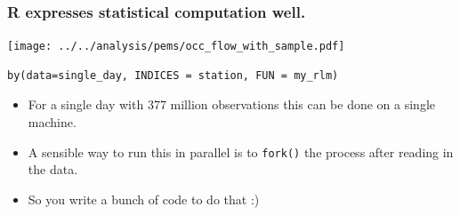 \documentclass{beamer}
\begin{document}
\begin{frame}[fragile]

    \frametitle{R expresses statistical computation well.}


    \centerline{\texttt{[image: ../../analysis/pems/occ\_flow\_with\_sample.pdf]}}

\begin{verbatim}
by(data=single_day, INDICES = station, FUN = my_rlm)
\end{verbatim}

    \begin{itemize}
        \item For a single day with 377 million observations this can be
            done on a single machine.
        \item A sensible way to run this in parallel is to \texttt{fork()}
            the process after reading in the data.
        \item So you write a bunch of code to do that :)
    \end{itemize}

\end{frame}
\end{document}
